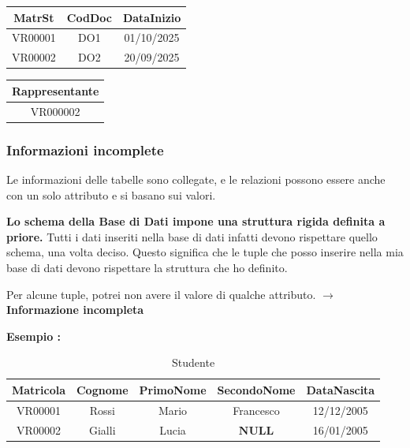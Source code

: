 \documentclass{article}
\newcounter{esempio}
\newenvironment{esempio}{
	\refstepcounter{esempio}%
	\noindent\textbf{Esempio \theesempio:}
}{\par}
\begin{document}
\begin{itemize}
\noindent
\begin{minipage}{.4\textwidth}
  \centering
    \begin{tabular}{|c|c|c|}
        \hline
         \textbf{MatrSt} & \textbf{CodDoc} & \textbf{DataInizio} \\
         \hline
         VR00001 & DO1 & 01/10/2025 \\
         \hline
         VR00002 & DO2 & 20/09/2025\\
         \hline
        \end{tabular}
\end{minipage}%
\hfill
\begin{minipage}{.4\textwidth}
  \centering
       \begin{tabular}{|c|}
        \hline
          \textbf{Rappresentante} \\
          \hline
            VR000002 \\
          \hline
        \end{tabular}
\end{minipage}
\end{itemize}

\subsubsection{Informazioni incomplete}
Le informazioni delle tabelle sono collegate, e le relazioni possono essere anche con un solo attributo e si basano sui valori.

\textbf{Lo schema della Base di Dati impone una struttura rigida definita a priore.} Tutti i dati inseriti nella base di dati infatti devono rispettare quello schema, una volta deciso. Questo significa che le tuple che posso inserire nella mia base di dati devono rispettare la struttura che ho definito. 

Per alcune tuple, potrei non avere il valore di qualche attributo. $\to$ \textbf{Informazione incompleta}
    
\begin{esempio}
	\begin{table}[h!]
		\centering
		\begin{tabular}{|c|c|c|c|c|}
			\hline
			\textbf{Matricola} & \textbf{Cognome} & \textbf{PrimoNome} & \textbf{SecondoNome} & \textbf{DataNascita}\\
			\hline
			VR00001 & Rossi & Mario & Francesco & 12/12/2005 \\
			\hline
			VR00002 & Gialli & Lucia & $\boldsymbol{NULL}$ & 16/01/2005 \\
			\hline
		\end{tabular}
		\caption{Studente}
		\label{tab:valorinull}
	\end{table}
\end{esempio}
\end{document}
